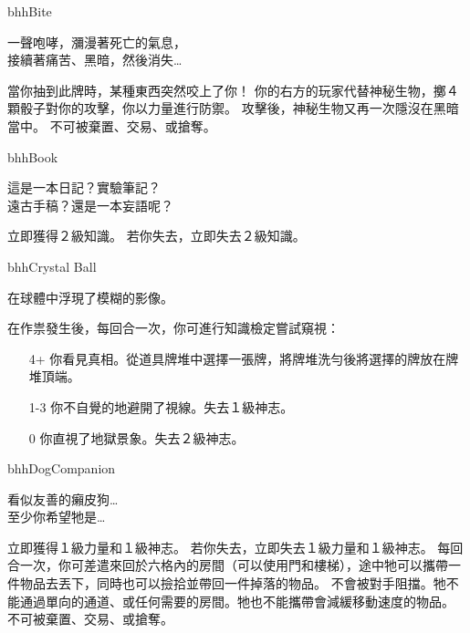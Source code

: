 %
\begin{OmenCard}{bhh}{Bite}{}
  \begin{CardStory}
    一聲咆哮，瀰漫著死亡的氣息，\\
    接續著痛苦、黑暗，然後消失…
  \end{CardStory}
  當你抽到此牌時，某種東西突然咬上了你！\smallbreak
  你的右方的玩家代替神秘生物，擲４顆骰子對你的攻擊，你以力量進行防禦。\smallbreak
  攻擊後，神秘生物又再一次隱沒在黑暗當中。\smallbreak
  \ThisName{}不可被棄置、交易、或搶奪。\smallbreak
\end{OmenCard}%
\linebreak[0]%
\begin{OmenCard}{bhh}{Book}{}
  \begin{CardStory}
    這是一本日記？實驗筆記？\\
    遠古手稿？還是一本妄語呢？
  \end{CardStory}
  立即獲得２級知識。\smallbreak
  若你失去\ThisName{}，立即失去２級知識。\smallbreak
\end{OmenCard}%
\linebreak[0]%
\begin{OmenCard}{bhh}{Crystal Ball}{}
  \begin{CardStory}
    在球體中浮現了模糊的影像。
  \end{CardStory}
  在作祟發生後，每回合一次，你可進行知識檢定嘗試窺視\ThisName{}：
  \begin{itemize}
    \item[4+] 你看見真相。從道具牌堆中選擇一張牌，將牌堆洗勻後將選擇的牌放在牌堆頂端。
    \item[1-3] 你不自覺的地避開了視線。失去１級神志。
    \item[0] 你直視了地獄景象。失去２級神志。
  \end{itemize}
\end{OmenCard}%
\linebreak[0]%
\begin{OmenCard}{bhh}{Dog}{Companion}
  \begin{CardStory}
    看似友善的癩皮狗…\\
    至少你希望牠是…
  \end{CardStory}
  立即獲得１級力量和１級神志。\smallbreak
  若你失去\ThisName{}，立即失去１級力量和１級神志。\smallbreak
  每回合一次，你可差遣\ThisName{}來回於六格內的房間（可以使用門和樓梯），途中牠可以攜帶一件物品去丟下，同時也可以撿拾並帶回一件掉落的物品。\smallbreak
  \ThisName{}不會被對手阻擋。牠不能通過單向的通道、或任何需要\RollAny{}的房間。牠也不能攜帶會減緩移動速度的物品。\smallbreak
  \ThisName{}不可被棄置、交易、或搶奪。\smallbreak
\end{OmenCard}%
